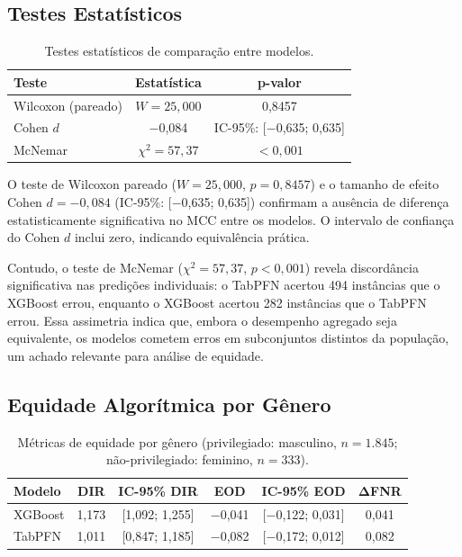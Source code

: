 \documentclass[12pt]{article}
\begin{document}
\subsection{Testes Estatísticos}

\begin{table}[htbp]
\centering
\caption{Testes estatísticos de comparação entre modelos.}
\label{tab:testes}
\begin{tabular}{lcc}
\hline
\textbf{Teste} & \textbf{Estatística} & \textbf{p-valor} \\
\hline
Wilcoxon (pareado) & $W = 25{,}000$ & 0,8457 \\
Cohen $d$ & $-$0,084 & IC-95\%: [$-$0,635; 0,635] \\
McNemar & $\chi^2 = 57{,}37$ & $< 0{,}001$ \\
\hline
\end{tabular}
\end{table}

O teste de Wilcoxon pareado ($W = 25{,}000$, $p = 0{,}8457$) e o tamanho de efeito Cohen $d = -0{,}084$ (IC-95\%: [$-$0,635; 0,635]) confirmam a ausência de diferença estatisticamente significativa no MCC entre os modelos. O intervalo de confiança do Cohen $d$ inclui zero, indicando equivalência prática.

Contudo, o teste de McNemar ($\chi^2 = 57{,}37$, $p < 0{,}001$) revela discordância significativa nas predições individuais: o TabPFN acertou 494 instâncias que o XGBoost errou, enquanto o XGBoost acertou 282 instâncias que o TabPFN errou. Essa assimetria indica que, embora o desempenho agregado seja equivalente, os modelos cometem erros em subconjuntos distintos da população, um achado relevante para análise de equidade.

\subsection{Equidade Algorítmica por Gênero}

\begin{table}[htbp]
\centering
\caption{Métricas de equidade por gênero (privilegiado: masculino, $n=1.845$; não-privilegiado: feminino, $n=333$).}
\label{tab:fairness_genero}
\begin{tabular}{lccccc}
\hline
\textbf{Modelo} & \textbf{DIR} & \textbf{IC-95\% DIR} & \textbf{EOD} & \textbf{IC-95\% EOD} & $\boldsymbol{\Delta}$\textbf{FNR} \\
\hline
XGBoost & 1,173 & [1,092; 1,255] & $-$0,041 & [$-$0,122; 0,031] & 0,041 \\
TabPFN  & 1,011 & [0,847; 1,185] & $-$0,082 & [$-$0,172; 0,012] & 0,082 \\
\hline
\end{tabular}
\end{table}
\end{document}
